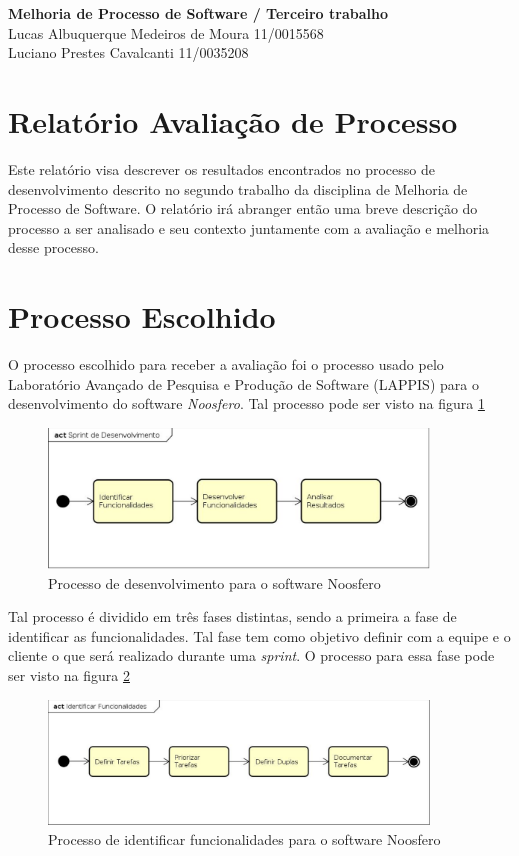 \documentclass[a4paper, 11pt]{article}
\begin{document}
\noindent
\large\textbf{Melhoria de Processo de Software / Terceiro trabalho}\\
Lucas Albuquerque Medeiros de Moura \hfill 11/0015568 \\
Luciano Prestes Cavalcanti \hfill 11/0035208

\section*{Relatório Avaliação de Processo}

Este relatório visa descrever os resultados encontrados no processo de
desenvolvimento descrito no segundo trabalho da disciplina de Melhoria de
Processo de Software. O relatório irá abranger então uma breve descrição do
processo a ser analisado e seu contexto juntamente com a avaliação e melhoria
desse processo.

\section*{Processo Escolhido}\label{sec:processo}

O processo escolhido para receber a avaliação foi o processo usado pelo
Laboratório Avançado de Pesquisa e Produção de Software (LAPPIS) para o
desenvolvimento do software \textit{Noosfero}. Tal processo pode ser visto na
figura \ref{fig:processo_noosfero}

\begin{figure}[h]
  \centering
  \includegraphics[width=0.9\textwidth]{figuras/processo_mps.eps}
  \caption{Processo de desenvolvimento para o software Noosfero}
  \label{fig:processo_noosfero}
\end{figure}

Tal processo é dividido em três fases distintas, sendo a primeira a fase de
identificar as funcionalidades. Tal fase tem como objetivo definir com a equipe
e o cliente o que será realizado durante uma \textit{sprint}. O processo para
essa fase pode ser visto na figura \ref{fig:processo_noosfero_funcionalidade}

\begin{figure}[h]
  \centering
  \includegraphics[width=0.9\textwidth]{figuras/processo_mps_funcionalidades.eps}
  \caption{Processo de identificar funcionalidades para o software Noosfero}
  \label{fig:processo_noosfero_funcionalidade}
\end{figure}
\end{document}

